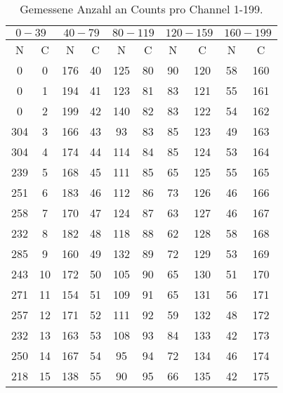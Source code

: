 \begin{table}
    \centering
    \caption{Gemessene Anzahl an Counts pro Channel 1-199.} 
    \label{1}
    \label{}
    \begin{tabular}{c c || c c || c c || c c || c c}
        \midrule
        \multicolumn{2}{c}{$0-39$} & \multicolumn{2}{c}{$40-79$} & \multicolumn{2}{c}{$80-119$} & \multicolumn{2}{c}{$120-159$} & \multicolumn{2}{c}{$160-199$} \\
        \midrule
        N & C & N & C & N & C & N & C & N & C \\
        \midrule
0        &   0     &176      &   40&125     &    80  &90      &120 & 58     & 160  \\
0        &   1     &194      &   41&123     &    81  &83      &121 & 55     & 161  \\
0        &   2     &199      &   42&140     &    82  &83      &122 & 54     & 162  \\
304      &   3     &166      &   43&93      &    83  &85      &123 & 49     & 163  \\
304      &   4     &174      &   44&114     &    84  &85      &124 & 53     & 164  \\
239      &   5     &168      &   45&111     &    85  &65      &125 & 55     & 165  \\
251      &   6     &183      &   46&112     &    86  &73      &126 & 46     & 166  \\
258      &   7     &170      &   47&124     &    87  &63      &127 & 46     & 167  \\
232      &   8     &182      &   48&118     &    88  &62      &128 & 58     & 168  \\
285      &   9     &160      &   49&132     &    89  &72      &129 & 53     & 169  \\
243      &   10    &172      &   50&105     &    90  &65      &130 & 51     & 170  \\
271      &   11    &154      &   51&109     &    91  &65      &131 & 56     & 171  \\
257      &   12    &171      &   52&111     &    92  &59      &132 & 48     & 172  \\
232      &   13    &163      &   53&108     &    93  &84      &133 & 42     & 173  \\
250      &   14    &167      &   54&95      &    94  &72      &134 & 46     & 174  \\
218      &   15    &138      &   55&90      &    95  &66      &135 & 42     & 175  \\

\end{tabular}
\end{table}
